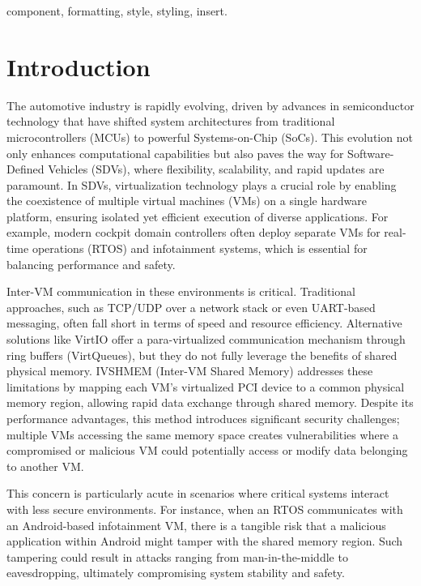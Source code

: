 \documentclass[conference]{IEEEtran}
\begin{document}
\begin{IEEEkeywords}
component, formatting, style, styling, insert.
\end{IEEEkeywords}

\section{Introduction}
The automotive industry is rapidly evolving, driven by advances in semiconductor technology that have shifted system architectures from traditional microcontrollers (MCUs) to powerful Systems-on-Chip (SoCs). This evolution not only enhances computational capabilities but also paves the way for Software-Defined Vehicles (SDVs), where flexibility, scalability, and rapid updates are paramount. In SDVs, virtualization technology plays a crucial role by enabling the coexistence of multiple virtual machines (VMs) on a single hardware platform, ensuring isolated yet efficient execution of diverse applications. For example, modern cockpit domain controllers often deploy separate VMs for real-time operations (RTOS) and infotainment systems, which is essential for balancing performance and safety.

Inter-VM communication in these environments is critical. Traditional approaches, such as TCP/UDP over a network stack or even UART-based messaging, often fall short in terms of speed and resource efficiency. Alternative solutions like VirtIO offer a para-virtualized communication mechanism through ring buffers (VirtQueues), but they do not fully leverage the benefits of shared physical memory. IVSHMEM (Inter-VM Shared Memory) addresses these limitations by mapping each VM's virtualized PCI device to a common physical memory region, allowing rapid data exchange through shared memory. Despite its performance advantages, this method introduces significant security challenges; multiple VMs accessing the same memory space creates vulnerabilities where a compromised or malicious VM could potentially access or modify data belonging to another VM.

This concern is particularly acute in scenarios where critical systems interact with less secure environments. For instance, when an RTOS communicates with an Android-based infotainment VM, there is a tangible risk that a malicious application within Android might tamper with the shared memory region. Such tampering could result in attacks ranging from man-in-the-middle to eavesdropping, ultimately compromising system stability and safety.
\end{document}
